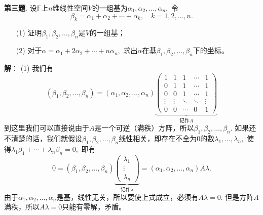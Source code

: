 \fi  %

\newpageorvspace

{\bf 第三题}. 设$\mathbb{F}$上$n$维线性空间$V$的一组基为$\alpha_1, \alpha_2, \ldots, \alpha_n,$ 令
$$\beta_k = \alpha_1 + \alpha_2 + \cdots + \alpha_k, \quad k = 1, 2, \ldots, n.$$
\begin{itemize}
\item[(1)] 证明$\beta_1, \beta_2, \ldots, \beta_n$是$V$的一组基；
\item[(2)] 对于$\alpha = \alpha_1 + 2 \alpha_2 + \cdots + n \alpha_n,$ 求出$\alpha$在基$\beta_1, \beta_2, \ldots, \beta_n$下的坐标。
\end{itemize}

\ifIncludeAnswer

\newpageorvspace

{\bf 解}： (1) 我们有
$$(\beta_1, \beta_2, \ldots, \beta_n) = (\alpha_1, \alpha_2, \ldots, \alpha_n) \underbrace{ \begin{pmatrix} 1 & 1 & 1 & \cdots & 1 \\ 0 & 1 & 1 & \cdots & 1 \\ 0 & 0 & 1 & \cdots & 1 \\ \vdots & \vdots & \ddots & \ddots & \vdots \\ 0 & 0 & \cdots & 0 & 1 \end{pmatrix} }_{\text{记作} A}$$
到这里我们可以直接说由于$A$是一个可逆（满秩）方阵，所以$\beta_1, \beta_2, \ldots, \beta_n.$ 如果还不清楚的话，我们就假设$\beta_1, \beta_2, \ldots, \beta_n$线性相关，即存在不全为0的数$\lambda_1, \ldots, \lambda_n,$ 使得$\lambda_1 \beta_1 + \cdots + \lambda_n \beta_n = 0,$ 即有
$$0 = (\beta_1, \beta_2, \ldots, \beta_n) \underbrace{ \begin{pmatrix} \lambda_1 \\ \vdots \\ \lambda_n \end{pmatrix} }_{\text{记作} \lambda} = (\alpha_1, \alpha_2, \ldots, \alpha_n) A \lambda.$$
由于$\alpha_1, \alpha_2, \ldots, \alpha_n$是基，线性无关，所以要使上式成立，必须有$A\lambda = 0.$ 但是方阵$A$满秩，所以$A\lambda = 0$只能有零解，矛盾。

